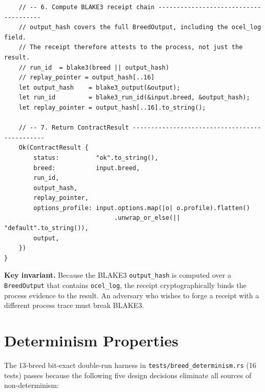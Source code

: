 \begin{verbatim}
    // -- 6. Compute BLAKE3 receipt chain --------------------------------------
    // output_hash covers the full BreedOutput, including the ocel_log field.
    // The receipt therefore attests to the process, not just the result.
    // run_id  = blake3(breed || output_hash)
    // replay_pointer = output_hash[..16]
    let output_hash    = blake3_output(&output);
    let run_id         = blake3_run_id(&input.breed, &output_hash);
    let replay_pointer = output_hash[..16].to_string();

    // -- 7. Return ContractResult ----------------------------------------------
    Ok(ContractResult {
        status:          "ok".to_string(),
        breed:           input.breed,
        run_id,
        output_hash,
        replay_pointer,
        options_profile: input.options.map(|o| o.profile).flatten()
                              .unwrap_or_else(|| "default".to_string()),
        output,
    })
}
\end{verbatim}

\noindent
\textbf{Key invariant.}
Because the BLAKE3 \texttt{output\_hash} is computed over a \texttt{BreedOutput}
that contains \texttt{ocel\_log}, the receipt cryptographically binds the
process evidence to the result.  An adversary who wishes to forge a receipt
with a different process trace must break BLAKE3.

\section{Determinism Properties}
\label{app:determinism}

The 13-breed bit-exact double-run harness in
\texttt{tests/breed\_determinism.rs} (16 tests) passes because the following
five design decisions eliminate all sources of non-determinism:


